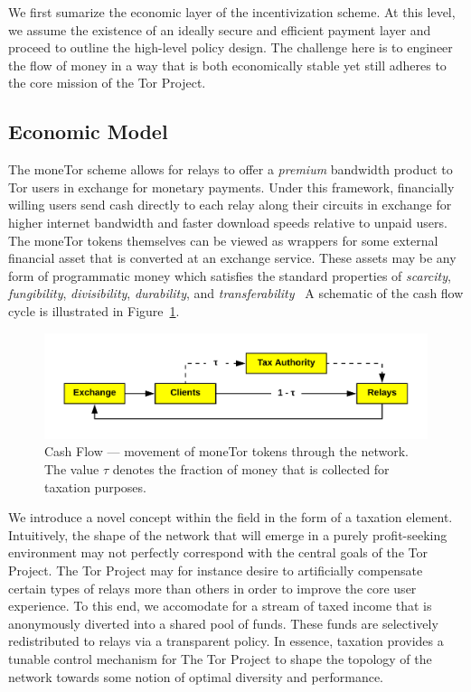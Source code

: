 
We first sumarize the economic layer of the incentivization scheme. At this
level, we assume the existence of an ideally secure and efficient payment layer
and proceed to outline the high-level policy design. The challenge here is to
engineer the flow of money in a way that is both economically stable yet still
adheres to the core mission of the Tor Project.

\subsection{Economic Model}
The moneTor scheme allows for relays to offer a \emph{premium} bandwidth product
to Tor users in exchange for monetary payments. Under this framework,
financially willing users send cash directly to each relay along their circuits
in exchange for higher internet bandwidth and faster download speeds relative to
unpaid users. The moneTor tokens themselves can be viewed as wrappers for some
external financial asset that is converted at an exchange service. These assets
may be any form of programmatic money which satisfies the standard properties of
\textit{scarcity}, \textit{fungibility}, \textit{divisibility},
\textit{durability}, and
\textit{transferability}~\cite[p.3]{crump2011phenomenon} A schematic of the cash
flow cycle is illustrated in Figure~\ref{fig:economic}.
\begin{figure}[h] \centering
  \includegraphics[trim={0.5cm, 0.5cm, 0.5cm, 0.5cm}, clip, scale=0.7]{images/economic_diagram.png}
  \caption[Cash Flow]{Cash Flow --- movement of moneTor tokens through the
    network. The value $\tau$ denotes the fraction of money that is collected
    for taxation purposes.}
  \label{fig:economic}
\end{figure}
We introduce a novel concept within the field in the form of a taxation
element. Intuitively, the shape of the network that will emerge in a purely
profit-seeking environment may not perfectly correspond with the central goals
of the Tor Project. The Tor Project may for instance desire to artificially
compensate certain types of relays more than others in order to improve the core
user experience. To this end, we accomodate for a stream of taxed income that is
anonymously diverted into a shared pool of funds. These funds are selectively
redistributed to relays via a transparent policy.  In essence, taxation provides
a tunable control mechanism for The Tor Project to shape the topology of the
network towards some notion of optimal diversity and performance.

